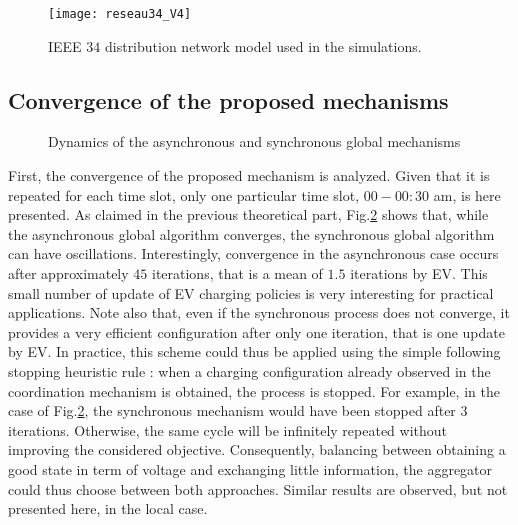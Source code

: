 \documentclass[journal]{IEEEtran}
\begin{document}
\begin{figure}[!htbp]
\centering
\texttt{[image: reseau34\_V4]}
\caption{IEEE $34$ distribution network model used in the simulations.}
\label{DistribNet}
\end{figure}

\subsection{Convergence of the proposed mechanisms}


\begin{figure}[tbp]\vspace{-3mm}
\begin{center}\vspace{-2mm}
\vspace{-2mm}
\caption{Dynamics of the asynchronous and synchronous global mechanisms}
\label{fig:Dyn} 
\end{center}\vspace{-5mm}
\end{figure}

First, the convergence of the proposed mechanism is analyzed. Given that it is repeated for each time slot, only one particular time slot, $00-00:30$ am, is here presented. As claimed in the previous theoretical part, Fig.\ref{fig:Dyn} shows that, while the asynchronous global algorithm converges, the synchronous global algorithm can have oscillations. Interestingly, convergence in the asynchronous case occurs after approximately $45$ iterations, that is a mean of $1.5$ iterations by EV. This small number of update of EV charging policies is very interesting for practical applications. Note also that, even if the synchronous process does not converge, it provides a very efficient configuration after only one iteration, that is one update by EV. In practice, this scheme could thus be applied using the simple following stopping heuristic rule : when a charging configuration already observed in the coordination mechanism is obtained, the process is stopped. For example, in the case of Fig.\ref{fig:Dyn}, the synchronous mechanism would have been stopped after $3$ iterations. Otherwise, the same cycle will be infinitely repeated without improving the considered objective. Consequently, balancing between obtaining a good state in term of voltage and exchanging little information, the aggregator could thus choose between both approaches. Similar results are observed, but not presented here, in the local case.   
\end{document}
